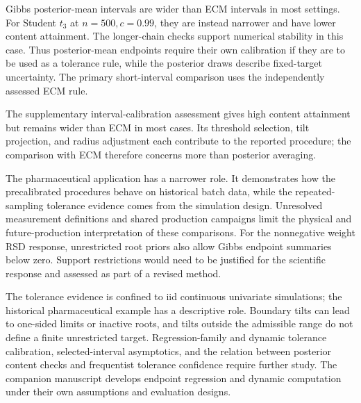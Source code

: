 \documentclass[11pt]{article}
\numberwithin{equation}{section}
\begin{document}
Gibbs posterior-mean intervals are wider than ECM intervals in most settings.
For Student \(t_3\) at \(n=500,c=0.99\), they are instead narrower and have
lower content attainment. The longer-chain checks support numerical stability
in this case. Thus posterior-mean endpoints require their own calibration if
they are to be used as a tolerance rule, while the posterior draws describe
fixed-target uncertainty. The primary short-interval comparison uses the
independently assessed ECM rule.

The supplementary interval-calibration assessment gives high content attainment
but remains wider than ECM in most cases. Its threshold selection, tilt
projection, and radius adjustment each contribute to the reported procedure;
the comparison with ECM therefore concerns more than posterior averaging.

The pharmaceutical application has a narrower role. It demonstrates how the
precalibrated procedures behave on historical batch data, while the
repeated-sampling tolerance evidence comes from the simulation design.
Unresolved measurement definitions and shared production campaigns limit the
physical and future-production interpretation of these comparisons.
For the nonnegative weight RSD response, unrestricted root priors also allow
Gibbs endpoint summaries below zero. Support restrictions would need to be
justified for the scientific response and assessed as part of a revised method.

The tolerance evidence is confined to iid continuous univariate simulations;
the historical pharmaceutical example has a descriptive role. Boundary tilts
can lead to one-sided limits or inactive roots, and tilts
outside the admissible range do not define a finite unrestricted target.
Regression-family and dynamic tolerance calibration, selected-interval
asymptotics, and the relation between posterior content checks and frequentist
tolerance confidence require further study. The companion manuscript develops
endpoint regression and dynamic computation under their own assumptions and
evaluation designs.

\clearpage


\end{document}
